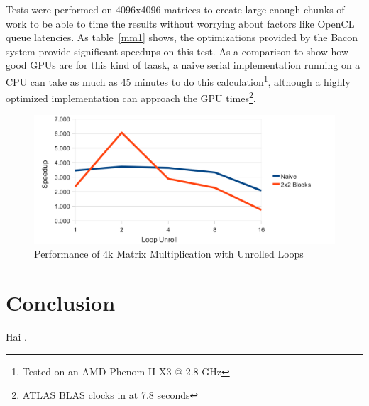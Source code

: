 \documentclass{llncs}
\begin{document}
Tests were performed on 4096x4096 matrices to create large enough
chunks of work to be able to time the results without worrying about
factors like OpenCL queue latencies. As table~\ref{mm1} shows, the
optimizations provided by the Bacon system provide significant
speedups on this test. As a comparison to show how good GPUs are for
this kind of taask, a naive serial implementation running on a CPU can
take as much as 45 minutes to do this calculation\footnote{Tested on
  an AMD Phenom II X3 @ 2.8 GHz}, although a highly optimized
implementation can approach the GPU times\footnote{ATLAS BLAS clocks
  in at 7.8 seconds}.


\begin{figure}[tbh]
\begin{center}
\includegraphics[clip]{unrolling}
\end{center}
\caption{Performance of 4k Matrix Multiplication with Unrolled Loops}\label{unroll}
\end{figure}

\section{Conclusion}
Hai \cite{Berlin:1990}.

{}

\end{document}
